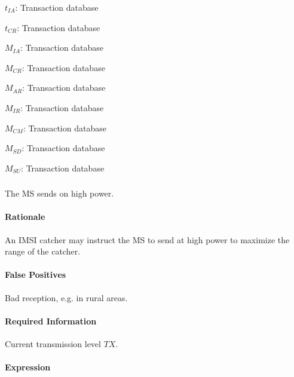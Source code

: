 \documentclass[a4paper,11pt,notitlepage,bigheadings,oneside]{scrartcl}
\begin{document}
$t_{IA}$: Transaction database


$t_{CR}$: Transaction database


$M_{IA}$: Transaction database


$M_{CR}$: Transaction database


$M_{AR}$: Transaction database


$M_{IR}$: Transaction database


$M_{CM}$: Transaction database


$M_{SD}$: Transaction database


$M_{SU}$: Transaction database


\subsubsection{}

The MS sends on high power.

\paragraph{Rationale}

An IMSI catcher may instruct the MS to send at high power to maximize the range
of the catcher.

\paragraph{False Positives}

Bad reception, e.g. in rural areas.

\paragraph{Required Information}

Current transmission level $TX$.

\paragraph{Expression}
\end{document}
